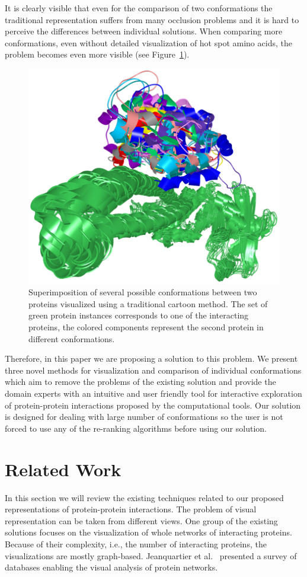 \documentclass[journal]{vgtc}                %
\begin{document}
It is clearly visible that even for the comparison of two conformations the traditional representation suffers from many occlusion problems and it is hard to perceive the differences between individual solutions.
When comparing more conformations, even without detailed visualization of hot spot amino acids, the problem becomes even more visible (see Figure~\ref{fig:problem}).

\begin{figure}[b]
  \centering
  \includegraphics[width=0.7\columnwidth]{problem.png}
  \caption{Superimposition of several possible conformations between two proteins visualized using a traditional cartoon method. The set of green protein instances corresponds to one of
the interacting proteins, the colored components represent the second protein in different conformations.}
  \label{fig:problem}
\end{figure}

Therefore, in this paper we are proposing a solution to this problem.
We present three novel methods for visualization and comparison of individual conformations which aim to remove the problems of the existing solution and provide the domain experts with an intuitive and user friendly tool for interactive exploration of protein-protein interactions proposed by the computational tools.
Our solution is designed for dealing with large number of conformations so the user is not forced to use any of the re-ranking algorithms before using our solution. 

\section{Related Work}
In this section we will review the existing techniques related to our proposed representations of protein-protein interactions.
The problem of visual representation can be taken from different views.
One group of the existing solutions focuses on the visualization of whole networks of interacting proteins.
Because of their complexity, i.e., the number of interacting proteins, the visualizations are mostly graph-based.
Jeanquartier et al.~\cite{Jeanquartier2015} presented a survey of databases enabling the visual analysis of protein networks.
\end{document}
